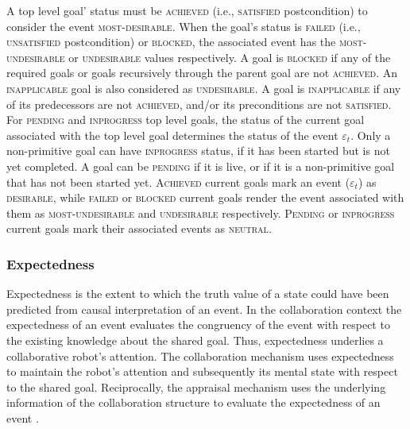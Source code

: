 
A top level goal' status must be \textsc{achieved} (i.e., \textsc{satisfied}
postcondition) to consider the event \textsc{most-desirable}. When the goal's
status is \textsc{failed} (i.e., \textsc{unsatisfied} postcondition) or
\textsc{blocked}, the associated event has the \textsc{most-undesirable} or
\textsc{undesirable} values respectively. A goal is \textsc{blocked} if any of
the required goals or goals recursively through the parent goal are not
\textsc{achieved}. An \textsc{inapplicable} goal is also considered as
\textsc{undesirable}. A goal is \textsc{inapplicable} if any of its predecessors
are not \textsc{achieved}, and/or its preconditions are not \textsc{satisfied}.
For \textsc{pending} and \textsc{inprogress} top level goals, the status of the
current goal associated with the top level goal determines the status of the
event $\varepsilon_t$. Only a non-primitive goal can have \textsc{inprogress}
status, if it has been started but is not yet completed. A goal can be
\textsc{pending} if it is live, or if it is a non-primitive goal that has not
been started yet. \textsc{Achieved} current goals mark an event
($\varepsilon_t$) as \textsc{desirable}, while \textsc{failed} or
\textsc{blocked} current goals render the event associated with them as
\textsc{most-undesirable} and \textsc{undesirable} respectively.
\textsc{Pending} or \textsc{inprogress} current goals mark their associated
events as \textsc{neutral}.

\vspace*{-2mm}
\subsubsection{Expectedness}

Expectedness is the extent to which the truth value of a state could have been
predicted from causal interpretation of an event. In the collaboration context
the expectedness of an event evaluates the congruency of the event with respect
to the existing knowledge about the shared goal. Thus, expectedness underlies a
collaborative robot's attention. The collaboration mechanism uses expectedness
to maintain the robot's attention and subsequently its mental state with respect
to the shared goal. Reciprocally, the appraisal mechanism uses the underlying
information of the collaboration structure to evaluate the expectedness of an
event \cite{shayganfar:appraisal-short}.

